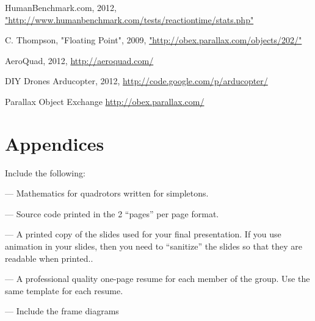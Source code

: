 \documentclass{article}
\numberwithin{equation}{section} %
\begin{document}
\begin{thebibliography}{99}
	
	HumanBenchmark.com, 2012, \url{"http://www.humanbenchmark.com/tests/reactiontime/stats.php"}
	
	C. Thompson, "Floating Point", 2009, \url{"http://obex.parallax.com/objects/202/"}
	
	AeroQuad, 2012, \url{http://aeroquad.com/}
	
	DIY Drones Arducopter, 2012, \url{http://code.google.com/p/arducopter/}

	Parallax Object Exchange \url{http://obex.parallax.com/}
\end{thebibliography}


\section{Appendices}
 Include the following:

 --- Mathematics for quadrotors written for simpletons.
 
 --- Source code printed in the 2 “pages” per page format.
 
 --- A printed copy of the slides used for your final presentation. If you use animation in your slides, then you need to “sanitize” the slides so that they are readable when printed..
 
 --- A professional quality one-page resume for each member of the group. Use the same template for each resume.
 
 --- Include the frame diagrams
\end{document}
